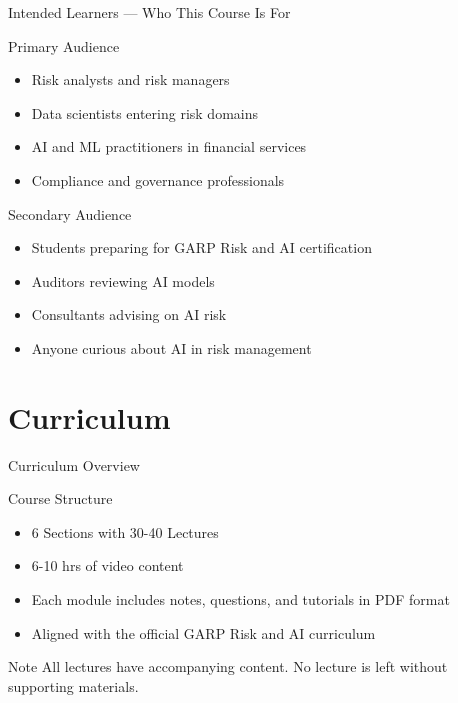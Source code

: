 \documentclass[aspectratio=169,11pt]{beamer}
\begin{document}
	\begin{frame}{Intended Learners --- Who This Course Is For}
		\begin{block}{Primary Audience}
			\begin{itemize}
				\item Risk analysts and risk managers
				\item Data scientists entering risk domains
				\item AI and ML practitioners in financial services
				\item Compliance and governance professionals
			\end{itemize}
		\end{block}
		\begin{block}{Secondary Audience}
			\begin{itemize}
				\item Students preparing for GARP Risk and AI certification
				\item Auditors reviewing AI models
				\item Consultants advising on AI risk
				\item Anyone curious about AI in risk management
			\end{itemize}
		\end{block}
	\end{frame}
	
	\section{Curriculum}
	
	\begin{frame}{Curriculum Overview}
		\begin{block}{Course Structure}
			\begin{itemize}
				\item 6 Sections with 30-40 Lectures
				\item 6-10 hrs of video content
				\item Each module includes notes, questions, and tutorials in PDF format
				\item Aligned with the official GARP Risk and AI curriculum
			\end{itemize}
		\end{block}
		\begin{block}{Note}
			All lectures have accompanying content. No lecture is left without supporting materials.
		\end{block}
	\end{frame}
	
\end{document}
